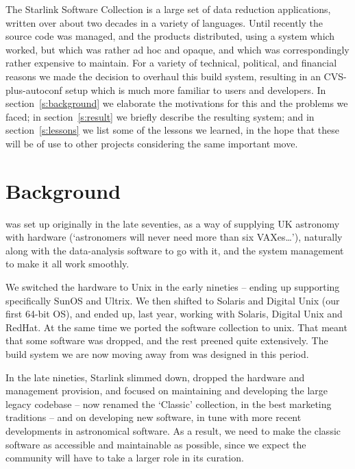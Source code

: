 \documentclass[11pt,twoside]{article}
\begin{document}
The Starlink Software Collection is a large set of data reduction
applications, written over about two decades in a variety of
languages.  Until recently the source code was managed, and the
products distributed, using a system which worked, but which was
rather ad hoc and opaque, and which was correspondingly rather
expensive to maintain.  For a variety of technical, political, and financial
reasons we made the decision to overhaul this build system, resulting
in an CVS-plus-autoconf setup which is much more familiar to users and
developers.   In section~\ref{s:background} we elaborate the
motivations for this and the problems we faced; in
section~\ref{s:result} we briefly describe the resulting system; and
in section~\ref{s:lessons} we list some of the lessons we learned, in
the hope that these will be of use to other projects considering the
same important move.



\section{Background\label{s:background}}


 was set up
originally in the late seventies, as a way of supplying UK astronomy
with hardware (`astronomers will never need more than six
VAXes\dots'), naturally along with the data-analysis software to go
with it, and the system management to make it all work smoothly.

We switched the hardware to Unix in the early nineties -- ending up
supporting specifically SunOS and Ultrix.  We then shifted to Solaris
and Digital Unix (our first 64-bit OS), and ended up, last year,
working with Solaris, Digital Unix and RedHat.
At the same time we ported the software
collection to unix.  That meant that some software was dropped, and the rest
preened quite extensively.  The build system we are now moving away
from was designed in this period.

In the late nineties, Starlink slimmed down, dropped the hardware and
management provision, and focused on maintaining and developing the
large legacy codebase -- now renamed the `Classic' collection, in the
best marketing traditions -- and on developing new software, in tune with
more recent developments in astronomical software.  As a result, we
need to make the classic software as accessible and maintainable as
possible, since we expect the community will have to take a larger
role in its curation.
\end{document}
